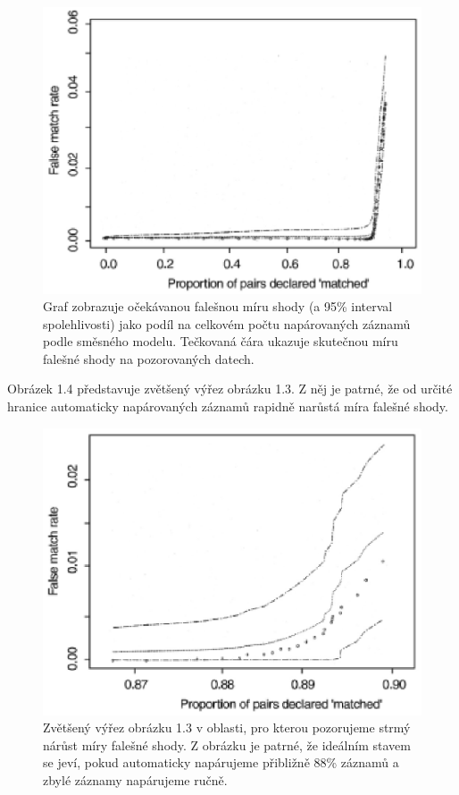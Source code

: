 \begin{figure}[htp]
\centering
\includegraphics[scale = 0.65]{pictures/fig_1_4.eps}
\caption{Graf zobrazuje očekávanou falešnou míru shody (a 95\% interval spolehlivosti) jako podíl na celkovém počtu napárovaných záznamů podle směsného modelu. Tečkovaná čára ukazuje skutečnou míru falešné shody na pozorovaných datech.}
\label{fig_1_4}
\end{figure}

Obrázek 1.4 představuje zvětšený výřez obrázku 1.3. Z něj je patrné, že od určité hranice automaticky napárovaných záznamů rapidně narůstá míra falešné shody.

\begin{figure}[htp]
\centering
\includegraphics[scale = 0.65]{pictures/fig_1_5.eps}
\caption{Zvětšený výřez obrázku 1.3 v oblasti, pro kterou pozorujeme strmý nárůst míry falešné shody. Z obrázku je patrné, že ideálním stavem se jeví, pokud automaticky napárujeme přibližně 88\% záznamů a zbylé záznamy napárujeme ručně.}
\label{fig_1_5}
\end{figure}

